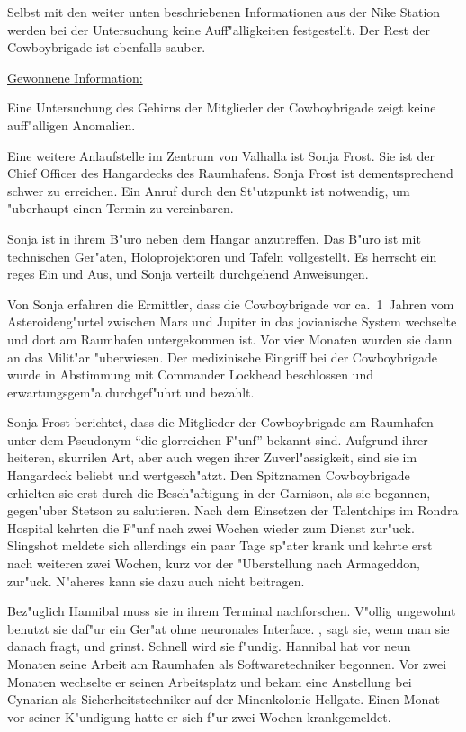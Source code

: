 Selbst mit den weiter unten beschriebenen Informationen aus der Nike Station werden bei der Untersuchung keine Auff"alligkeiten festgestellt. Der Rest der Cowboybrigade ist ebenfalls sauber.

\begin{remarks}
	\underline{Gewonnene Information:}
	
	Eine Untersuchung des Gehirns der Mitglieder der Cowboybrigade zeigt keine auff"alligen Anomalien.
\end{remarks}


Eine weitere Anlaufstelle im Zentrum von Valhalla ist Sonja Frost. Sie ist der Chief Officer des Hangardecks des Raumhafens. Sonja Frost ist dementsprechend schwer zu erreichen. Ein Anruf durch den St"utzpunkt ist notwendig, um "uberhaupt einen Termin zu vereinbaren.

Sonja ist in ihrem B"uro neben dem Hangar anzutreffen. Das B"uro ist mit technischen Ger"aten, Holoprojektoren und Tafeln vollgestellt. Es herrscht ein reges Ein und Aus, und Sonja verteilt durchgehend Anweisungen.

Von Sonja erfahren die Ermittler, dass die Cowboybrigade vor ca.~1\half~Jahren vom Asteroideng"urtel zwischen Mars und Jupiter in das jovianische System wechselte und dort am Raumhafen untergekommen ist. Vor vier Monaten wurden sie dann an das Milit"ar "uberwiesen. Der medizinische Eingriff bei der Cowboybrigade wurde in Abstimmung mit Commander Lockhead beschlossen und erwartungsgem"a\3 durchgef"uhrt und bezahlt.

Sonja Frost berichtet, dass die Mitglieder der Cowboybrigade am Raumhafen unter dem Pseudonym ``die glorreichen F"unf'' bekannt sind. Aufgrund ihrer heiteren, skurrilen Art, aber auch wegen ihrer Zuverl"assigkeit, sind sie im Hangardeck beliebt und wertgesch"atzt. Den Spitznamen Cowboybrigade erhielten sie erst durch die Besch"aftigung in der Garnison, als sie begannen, gegen"uber Stetson zu salutieren. Nach dem Einsetzen der Talentchips im Rondra Hospital kehrten die F"unf nach zwei Wochen wieder zum Dienst zur"uck. Slingshot meldete sich allerdings ein paar Tage sp"ater krank und kehrte erst nach weiteren zwei Wochen, kurz vor der "Uberstellung nach Armageddon, zur"uck. N"aheres kann sie dazu auch nicht beitragen.

Bez"uglich Hannibal muss sie in ihrem Terminal nachforschen. V"ollig ungewohnt benutzt sie daf"ur ein Ger"at ohne neuronales Interface. , sagt sie, wenn man sie danach fragt, und grinst. Schnell wird sie f"undig. Hannibal hat vor neun Monaten seine Arbeit am Raumhafen als Softwaretechniker begonnen. Vor zwei Monaten wechselte er seinen Arbeitsplatz und bekam eine Anstellung bei Cynarian als Sicherheitstechniker auf der Minenkolonie Hellgate. Einen Monat vor seiner K"undigung hatte er sich f"ur zwei Wochen krankgemeldet.

